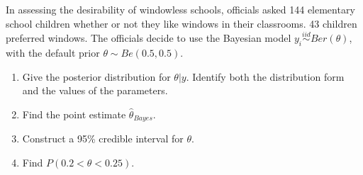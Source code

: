   \item 
    In assessing the desirability of windowless schools, officials asked 144
    elementary school children whether or not they like windows in their
    classrooms. 43 children preferred windows. The officials decide to use the Bayesian model $y_i\stackrel{iid}{\sim}Ber(\theta)$, with the default prior $\theta \sim Be(0.5,0.5)$.
    \begin{enumerate}
      \item Give the posterior distribution for $ \theta | y$. Identify both the distribution form and the values of the parameters. 
      \item Find the point estimate $\hat{\theta}_{Bayes}$. 
      \item Construct a 95\% credible interval for $\theta$. 
      \item Find $P(0.2<\theta<0.25)$.
\end{enumerate}


